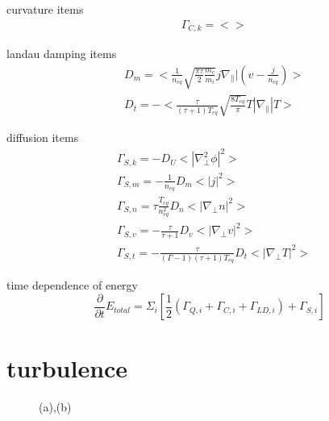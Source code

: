 \documentclass[11pt,a4paper]{article}
\begin{document}
curvature items
\begin{equation}
\begin{aligned}
&\Gamma_{C,k}=<>
\end{aligned}
\end{equation}

landau damping items
\begin{equation}
\begin{aligned}
&D_m=<\frac{1}{n_{eq}}\sqrt{\frac{\pi\tau}{2}\frac{m_e}{m_i}}j\nabla_\parallel|(v-\frac{j}{n_{eq}})> \\
&D_t=-<\frac{\tau}{(\tau+1)T_{eq}}\sqrt{\frac{8T_{eq}}{\pi}}T|\nabla_\parallel|T>
\end{aligned}
\end{equation}

diffusion items
\begin{equation}
\begin{aligned}
	&\Gamma_{S,k}=-D_U<|\nabla^2_\perp\phi|^2>	\\
	&\Gamma_{S,m}=-\frac{1}{n_{eq}}D_m<|j|^2>	\\
	&\Gamma_{S,n}=\tau\frac{T_{eq}}{n_{eq}^2}D_n<|\nabla_\perp{n}|^2>	\\
	&\Gamma_{S,v}=-\frac{\tau}{\tau+1}D_v<|\nabla_\perp{v}|^2>	\\
	&\Gamma_{S,t}=-\frac{\tau}{(\Gamma-1)(\tau+1)T_{eq}}D_t<|\nabla_\perp{T}|^2>
\end{aligned}
\end{equation}

time dependence of energy
\begin{equation}
\frac{\partial}{\partial{t}}E_{total}=\Sigma_i[ {\frac{1}{2}({\Gamma_{Q,i}}+{\Gamma_{C,i}}+{\Gamma_{LD,i}})} +\Gamma_{S,i}]
\end{equation}


\section{turbulence}
\begin{figure}[H]
	\centering
	\caption{(a),(b)}
\end{figure}
\end{document}
